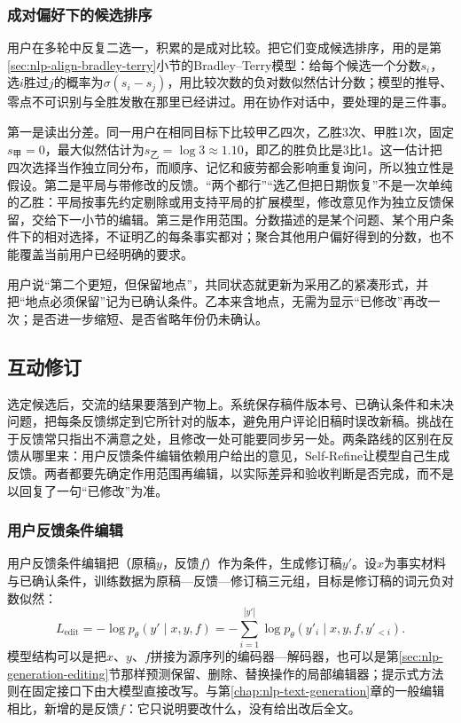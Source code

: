 \subsubsection{成对偏好下的候选排序}
\label{sec:nlp-dialogue-bradley-terry}

用户在多轮中反复二选一，积累的是成对比较。把它们变成候选排序，用的是第\ref{sec:nlp-align-bradley-terry}小节的Bradley--Terry模型：给每个候选一个分数$s_i$，选$i$胜过$j$的概率为$\sigma(s_i-s_j)$，用比较次数的负对数似然估计分数；模型的推导、零点不可识别与全胜发散在那里已经讲过。用在协作对话中，要处理的是三件事。

第一是读出分差。同一用户在相同目标下比较甲乙四次，乙胜3次、甲胜1次，固定$s_{\text{甲}}=0$，最大似然估计为$s_{\text{乙}}=\log3\approx1.10$，即乙的胜负比是3比1。这一估计把四次选择当作独立同分布，而顺序、记忆和疲劳都会影响重复询问，所以独立性是假设。第二是平局与带修改的反馈。“两个都行”“选乙但把日期恢复”不是一次单纯的乙胜：平局按事先约定剔除或用支持平局的扩展模型，修改意见作为独立反馈保留，交给下一小节的编辑。第三是作用范围。分数描述的是某个问题、某个用户条件下的相对选择，不证明乙的每条事实都对；聚合其他用户偏好得到的分数，也不能覆盖当前用户已经明确的要求。

用户说“第二个更短，但保留地点”，共同状态就更新为采用乙的紧凑形式，并把“地点必须保留”记为已确认条件。乙本来含地点，无需为显示“已修改”再改一次；是否进一步缩短、是否省略年份仍未确认。

\subsection{互动修订}
\label{sec:nlp-dialogue-revision}

选定候选后，交流的结果要落到产物上。系统保存稿件版本号、已确认条件和未决问题，把每条反馈绑定到它所针对的版本，避免用户评论旧稿时误改新稿。挑战在于反馈常只指出不满意之处，且修改一处可能要同步另一处。两条路线的区别在反馈从哪里来：用户反馈条件编辑依赖用户给出的意见，Self-Refine让模型自己生成反馈。两者都要先确定作用范围再编辑，以实际差异和验收判断是否完成，而不是以回复了一句“已修改”为准。

\subsubsection{用户反馈条件编辑}
\label{sec:nlp-dialogue-feedback-edit}

用户反馈条件编辑把（原稿$y$，反馈$f$）作为条件，生成修订稿$y'$。设$x$为事实材料与已确认条件，训练数据为原稿—反馈—修订稿三元组，目标是修订稿的词元负对数似然：
\begin{equation}
 L_{\mathrm{edit}}=-\log p_{\theta}(y'\mid x,y,f)
  =-\sum_{i=1}^{|y'|}\log p_{\theta}(y'_i\mid x,y,f,y'_{<i}).
 \label{eq:nlp-dialogue-feedback-edit}
\end{equation}
模型结构可以是把$x$、$y$、$f$拼接为源序列的编码器—解码器，也可以是第\ref{sec:nlp-generation-editing}节那样预测保留、删除、替换操作的局部编辑器；提示式方法则在固定接口下由大模型直接改写。与第\ref{chap:nlp-text-generation}章的一般编辑相比，新增的是反馈$f$：它只说明要改什么，没有给出改后全文。

